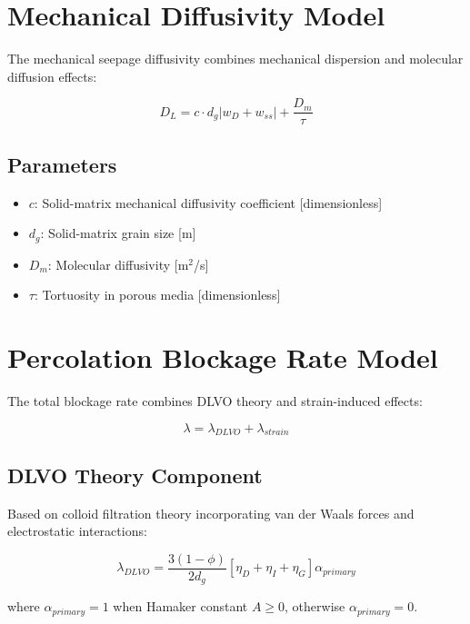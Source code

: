\documentclass[11pt,a4paper]{article}
\begin{document}
\section{Mechanical Diffusivity Model}

The mechanical seepage diffusivity combines mechanical dispersion and molecular diffusion effects:

\begin{equation}
\boxed{
D_L = c \cdot d_g |w_D + w_{ss}| + \frac{D_m}{\tau}
}
\end{equation}

\subsection{Parameters}
\begin{itemize}
    \item $c$: Solid-matrix mechanical diffusivity coefficient [dimensionless]
    \item $d_g$: Solid-matrix grain size [m]
    \item $D_m$: Molecular diffusivity [m$^2$/s]
    \item $\tau$: Tortuosity in porous media [dimensionless]
\end{itemize}

\section{Percolation Blockage Rate Model}

The total blockage rate combines DLVO theory and strain-induced effects:

\begin{equation}
\boxed{
\lambda = \lambda_{DLVO} + \lambda_{strain}
}
\end{equation}

\subsection{DLVO Theory Component}

Based on colloid filtration theory incorporating van der Waals forces and electrostatic interactions:

\begin{equation}
\boxed{
\lambda_{DLVO} = \frac{3(1-\phi)}{2d_g}[\eta_D + \eta_I + \eta_G]\alpha_{primary}
}
\end{equation}

where $\alpha_{primary} = 1$ when Hamaker constant $A \geq 0$, otherwise $\alpha_{primary} = 0$.
\end{document}
